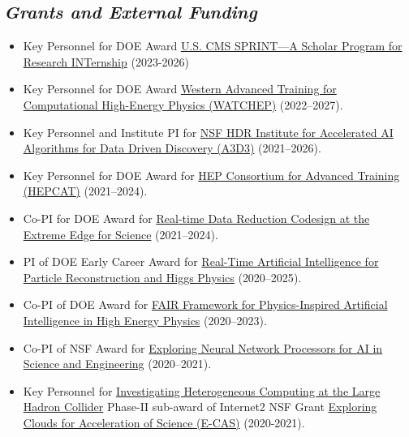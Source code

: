 \documentclass[11pt]{res}
\newcommand{\MarginText}[1]{\section{\textit{#1}}}
\begin{document}
\begin{resume}
  \MarginText{Grants and External Funding}
  \begin{itemize}
    \itemsep-0.3em
    \item Key Personnel for DOE Award \href{https://www.energy.gov/articles/doe-announces-32-million-research-opportunities-underrepresented-groups}{U.S. CMS SPRINT---A Scholar Program for Research INTernship} (2023-2026)
    \item Key Personnel for DOE Award \href{https://www.energy.gov/science/articles/department-energy-announces-10-million-traineeships-computational-high-energy}{Western Advanced Training for Computational High-Energy Physics (WATCHEP)} (2022--2027).
    \item Key Personnel and Institute PI for \href{https://www.nsf.gov/awardsearch/showAward?AWD_ID=2117997&HistoricalAwards=false}{NSF HDR Institute for Accelerated AI Algorithms for Data Driven Discovery (A3D3)} ({2021--2026}).
    \item Key Personnel for DOE Award for \href{https://science.osti.gov/-/media/hep/pdf/Awards/HEP_instrumentation_awards_list.pdf}{HEP Consortium for Advanced Training (HEPCAT)} ({2021--2024}).
    \item Co-PI for DOE Award for \href{https://science.osti.gov/-/media/ascr/pdf/funding/2021/Data_Reduction_Awards.pdf}{Real-time Data Reduction Codesign at the Extreme Edge for Science} ({2021--2024}).
    \item PI of DOE Early Career Award for \href{https://science.osti.gov/-/media/early-career/pdf/FY20_DOE_SC_Early_Career_Research_Program_Abstracts.pdf}{Real-Time Artificial Intelligence for Particle Reconstruction and Higgs Physics} ({2020--2025}).
    \item Co-PI of DOE Award for \href{https://science.osti.gov/-/media/ascr/pdf/programdocuments/docs/2020/List_of_Awards_FAIR_Data.pdf}{FAIR Framework for Physics-Inspired Artificial Intelligence in High Energy Physics} ({2020--2023}).
    \item Co-PI of NSF Award for \href{https://nsf.gov/awardsearch/showAward?AWD_ID=2005369}{Exploring Neural Network Processors for AI in Science and Engineering} ({2020--2021}).
    \item Key Personnel for \href{https://www.internet2.edu/news/detail/17957/}{Investigating Heterogeneous Computing at the Large Hadron Collider} Phase-II sub-award of Internet2 NSF Grant \href{https://www.nsf.gov/awardsearch/showAward?AWD_ID=1904444}{Exploring Clouds for Acceleration of Science (E-CAS)} ({2020-2021}).

\end{itemize}
\end{resume}
\end{document}
